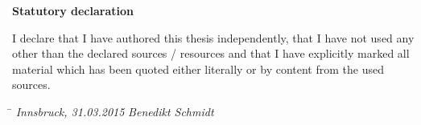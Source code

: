\vspace{5cm}
\begin{center}
	\textbf{Statutory declaration}
\end{center}

I declare that I have authored this thesis independently, that I have not used any other than the declared sources / resources and that I have explicitly marked all material which has been quoted either literally or by content from the used sources.

\vspace{3cm}
\begin{tabbing}
	\hspace{6cm}  \= \kill
	\textit{Innsbruck, 31.03.2015} \> \textit{Benedikt Schmidt}
\end{tabbing}